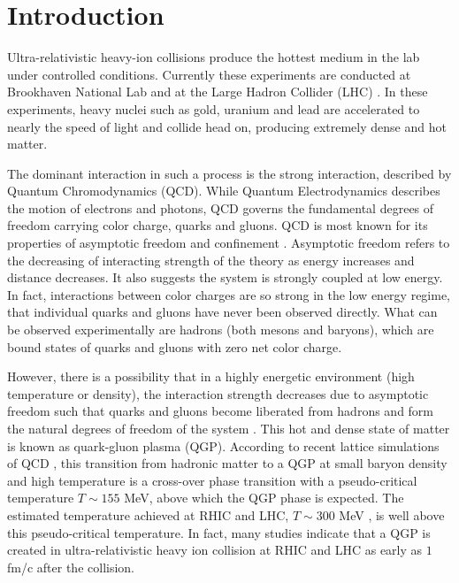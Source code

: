 \documentclass[aps,prl,twocolumn,groupedaddress]{revtex4-1}
\begin{document}
\pacs{}

\maketitle

\section{Introduction}
	Ultra-relativistic heavy-ion collisions produce the hottest medium in the lab under controlled conditions. Currently these experiments are conducted at Brookhaven National Lab \citep{Arsene:2004fa, Adams:2005dq} and at the Large Hadron Collider (LHC) \citep{Aamodt:2010pa}. 
	In these experiments, heavy nuclei such as gold, uranium and lead are accelerated to nearly the speed of light and collide head on, producing extremely dense and hot matter.
	 
	The dominant interaction in such a process is the strong interaction, described by Quantum Chromodynamics (QCD).
	While Quantum Electrodynamics describes the motion of electrons and photons, QCD governs the fundamental degrees of freedom carrying color charge, quarks and gluons.	
	QCD is most known for its properties of asymptotic freedom and confinement \citep{Gross:1973id, Politzer:1973fx}. 
	Asymptotic freedom refers to the decreasing of interacting strength of the theory as energy increases and distance decreases. It also suggests the system is strongly coupled at low energy.
	In fact, interactions between color charges are so strong in the low energy regime, that individual quarks and gluons have never been observed directly.
	What can be observed experimentally are hadrons (both mesons and baryons), which are bound states of quarks and gluons with zero net color charge.

	However, there is a possibility that in a highly energetic environment (high temperature or density), the interaction strength decreases due to asymptotic freedom such that quarks and gluons become liberated from hadrons and form the natural degrees of freedom of the system \citep{Collins:1974ky}. 
	This hot and dense state of matter is known as quark-gluon plasma (QGP). 
	According to recent lattice simulations of QCD \cite{Bhattacharya:2014ara}, this transition from hadronic matter to a QGP at small baryon density and high temperature is a cross-over phase transition with a pseudo-critical temperature $T \sim 155$ MeV, above which the QGP phase is expected.
	The estimated temperature achieved at RHIC and LHC, $T \sim 300$ MeV \citep{Adare:2009qk, Adam:2015lda}, is well above this pseudo-critical temperature.	
	In fact, many studies \cite{Muller:2006ee} indicate that a QGP is created in ultra-relativistic heavy ion collision at RHIC and LHC as early as $1$ fm/c after the collision.
	
\end{document}
